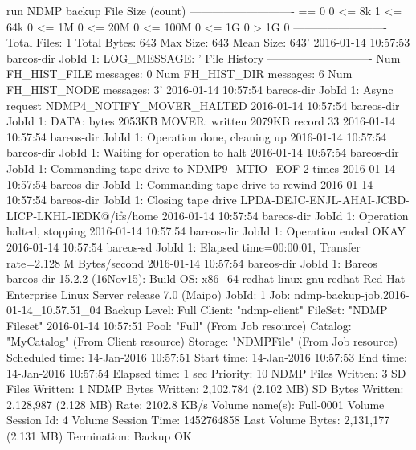 \begin{bconsole}{run NDMP backup}
        File Size (count)
        ----------------------------
        == 0                    0
        <= 8k                   1
        <= 64k                  0
        <= 1M                   0
        <= 20M                  0
        <= 100M                 0
        <= 1G                   0
         > 1G                   0
        -------------------------
        Total Files:            1
        Total Bytes:            643
        Max Size:               643
        Mean Size:              643'
 2016-01-14 10:57:53 bareos-dir JobId 1: LOG_MESSAGE: '
        File History
        ----------------------------
        Num FH_HIST_FILE messages:              0
        Num FH_HIST_DIR  messages:              6
        Num FH_HIST_NODE messages:              3'
 2016-01-14 10:57:54 bareos-dir JobId 1: Async request NDMP4_NOTIFY_MOVER_HALTED
 2016-01-14 10:57:54 bareos-dir JobId 1: DATA: bytes 2053KB  MOVER: written 2079KB record 33
 2016-01-14 10:57:54 bareos-dir JobId 1: Operation done, cleaning up
 2016-01-14 10:57:54 bareos-dir JobId 1: Waiting for operation to halt
 2016-01-14 10:57:54 bareos-dir JobId 1: Commanding tape drive to NDMP9_MTIO_EOF 2 times
 2016-01-14 10:57:54 bareos-dir JobId 1: Commanding tape drive to rewind
 2016-01-14 10:57:54 bareos-dir JobId 1: Closing tape drive LPDA-DEJC-ENJL-AHAI-JCBD-LICP-LKHL-IEDK@/ifs/home%
 2016-01-14 10:57:54 bareos-dir JobId 1: Operation halted, stopping
 2016-01-14 10:57:54 bareos-dir JobId 1: Operation ended OKAY
 2016-01-14 10:57:54 bareos-sd JobId 1: Elapsed time=00:00:01, Transfer rate=2.128 M Bytes/second
 2016-01-14 10:57:54 bareos-dir JobId 1: Bareos bareos-dir 15.2.2 (16Nov15):
  Build OS:               x86_64-redhat-linux-gnu redhat Red Hat Enterprise Linux Server release 7.0 (Maipo)
  JobId:                  1
  Job:                    ndmp-backup-job.2016-01-14_10.57.51_04
  Backup Level:           Full
  Client:                 "ndmp-client" 
  FileSet:                "NDMP Fileset" 2016-01-14 10:57:51
  Pool:                   "Full" (From Job resource)
  Catalog:                "MyCatalog" (From Client resource)
  Storage:                "NDMPFile" (From Job resource)
  Scheduled time:         14-Jan-2016 10:57:51
  Start time:             14-Jan-2016 10:57:53
  End time:               14-Jan-2016 10:57:54
  Elapsed time:           1 sec
  Priority:               10
  NDMP Files Written:     3
  SD Files Written:       1
  NDMP Bytes Written:     2,102,784 (2.102 MB)
  SD Bytes Written:       2,128,987 (2.128 MB)
  Rate:                   2102.8 KB/s
  Volume name(s):         Full-0001
  Volume Session Id:      4
  Volume Session Time:    1452764858
  Last Volume Bytes:      2,131,177 (2.131 MB)
  Termination:            Backup OK
\end{bconsole}

